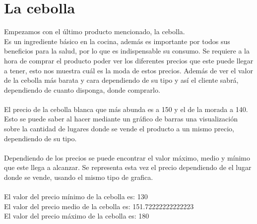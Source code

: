 \documentclass{article}
\begin{document}
    \part*{La cebolla}
    Empezamos con el último producto mencionado, la cebolla.
    \\
    Es un ingrediente básico en la cocina, además es importante por todos sus beneficios para la salud, por lo que es indispensable su consumo. 
    Se requiere a la hora de comprar el producto poder ver los diferentes precios que este puede llegar a tener, esto nos muestra cuál es la moda de estos precios. Además de ver el valor de la cebolla más barata y cara dependiendo de su tipo y así el cliente sabrá, dependiendo de cuanto disponga, donde comprarlo. \\
    \\
    El precio de la cebolla blanca que más abunda es a 150 y el de la morada a 140. Esto se puede saber al hacer mediante un gráfico de barras una visualización sobre la cantidad de lugares donde se vende el producto a un mismo precio, dependiendo de su tipo.\\
    \\
    Dependiendo de los precios se puede encontrar el valor máximo, medio y mínimo que este llega a alcanzar. Se representa esta vez el precio dependiendo de el lugar donde se vende, usando el mismo tipo de grafica.\\
    \\
    El valor del precio mínimo de la cebolla es: 130\\
    El valor del precio medio de la cebolla es: 151.72222222222223\\
    El valor del precio máximo de la cebolla es: 180\\
    \\
    \newpage
\end{document}
